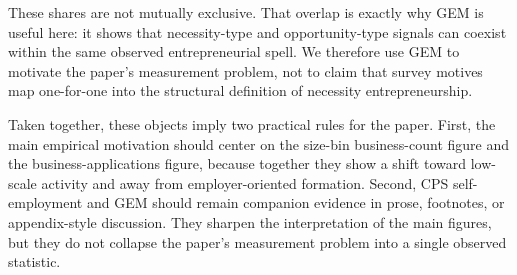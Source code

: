 These shares are not mutually exclusive. That overlap is exactly why GEM is
useful here: it shows that necessity-type and opportunity-type signals can
coexist within the same observed entrepreneurial spell. We therefore use GEM
to motivate the paper's measurement problem, not to claim that survey motives
map one-for-one into the structural definition of necessity entrepreneurship.

Taken together, these objects imply two practical rules for the paper. First,
the main empirical motivation should center on the size-bin business-count
figure and the business-applications figure, because together they show a
shift toward low-scale activity and away from employer-oriented formation.
Second, CPS self-employment and GEM should remain companion evidence in prose,
footnotes, or appendix-style discussion. They sharpen the interpretation of
the main figures, but they do not collapse the paper's measurement problem
into a single observed statistic.
